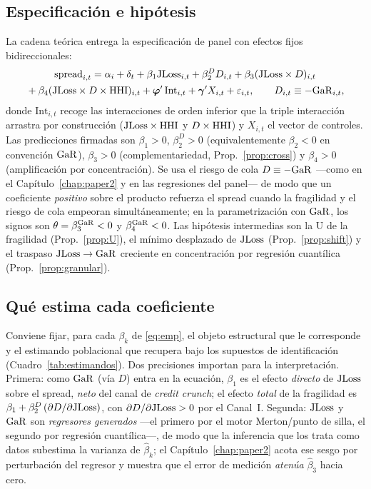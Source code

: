 \subsection{Especificación e hipótesis}
La cadena teórica entrega la especificación de panel con efectos fijos bidireccionales:
\begin{multline}
\mathrm{spread}_{i,t}=\alpha_i+\delta_t+\beta_1\mathrm{JLoss}_{i,t}+\beta_2^{D} D_{i,t}+\beta_3(\mathrm{JLoss}\times D)_{i,t}\\
{}+\beta_4(\mathrm{JLoss}\times D\times\mathrm{HHI})_{i,t}+\boldsymbol{\varphi}'\,\mathrm{Int}_{i,t}+\boldsymbol{\gamma}'X_{i,t}+\varepsilon_{i,t},\qquad D_{i,t}\equiv-\mathrm{GaR}_{i,t},
\label{eq:emp}
\end{multline}
donde $\mathrm{Int}_{i,t}$ recoge las interacciones de orden inferior que la triple interacción arrastra por construcción ($\mathrm{JLoss}\times\mathrm{HHI}$ y $D\times\mathrm{HHI}$) y $X_{i,t}$ el vector de controles. Las predicciones firmadas son $\beta_1>0$, $\beta_2^{D}>0$ (equivalentemente $\beta_2<0$ en convención $\mathrm{GaR}$), $\beta_3>0$ (complementariedad, Prop.~\ref{prop:cross}) y $\beta_4>0$ (amplificación por concentración). Se usa el riesgo de cola $D\equiv-\mathrm{GaR}$ —como en el Capítulo~\ref{chap:paper2} y en las regresiones del panel— de modo que un coeficiente \emph{positivo} sobre el producto refuerza el spread cuando la fragilidad y el riesgo de cola empeoran simultáneamente; en la parametrización con $\mathrm{GaR}$, los signos son $\theta=\beta_3^{\mathrm{GaR}}<0$ y $\beta_4^{\mathrm{GaR}}<0$. Las hipótesis intermedias son la U de la fragilidad (Prop.~\ref{prop:U}), el mínimo desplazado de $\mathrm{JLoss}$ (Prop.~\ref{prop:shift}) y el traspaso $\mathrm{JLoss}\to\mathrm{GaR}$ creciente en concentración por regresión cuantílica (Prop.~\ref{prop:granular}).

\subsection{Qué estima cada coeficiente}\label{sec:estimandos}
Conviene fijar, para cada $\beta_k$ de \eqref{eq:emp}, el objeto estructural que le
corresponde y el estimando poblacional que recupera bajo los supuestos de
identificación (Cuadro~\ref{tab:estimandos}). Dos precisiones importan para la
interpretación. Primera: como $\mathrm{GaR}$ (vía $D$) entra en la ecuación, $\beta_1$ es el
efecto \emph{directo} de $\mathrm{JLoss}$ sobre el spread, \emph{neto} del canal de
\textit{credit crunch}; el efecto \emph{total} de la fragilidad es
$\beta_1+\beta_2^{D}\,(\partial D/\partial\mathrm{JLoss})$, con
$\partial D/\partial\mathrm{JLoss}>0$ por el Canal~I. Segunda: $\mathrm{JLoss}$ y $\mathrm{GaR}$ son
\emph{regresores generados} —el primero por el motor Merton/punto de silla, el
segundo por regresión cuantílica—, de modo que la inferencia que los trata como
datos subestima la varianza de $\hat\beta_k$; el Capítulo~\ref{chap:paper2} acota
ese sesgo por perturbación del regresor y muestra que el error de medición
\emph{atenúa} $\hat\beta_3$ hacia cero.

